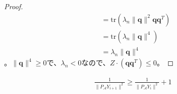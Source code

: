\begin{proof}
\begin{align*}
                                      & = \mathrm{tr}(\lambda_n \|\mathbf{q}\|^2 \mathbf{q} \mathbf{q}^T) \\
                                      & = \mathrm{tr}(\lambda_n \|\mathbf{q}\|^4) \\
                                      & = \lambda_n \|\mathbf{q}\|^4
  \end{align*}
  。$\|\mathbf{q}\|^4 \geq 0$で、$\lambda_n < 0$なので、$Z \cdot (\mathbf{q} \mathbf{q}^T) \leq 0$。
\end{proof}

\begin{lemma*}
  \begin{align*}
    \frac{1}{\|P_\mathcal{A} Y_{i + 1}\|^2} \geq \frac{1}{\|P_\mathcal{A} Y_i\|^2} + 1
  \end{align*}
\end{lemma*}
